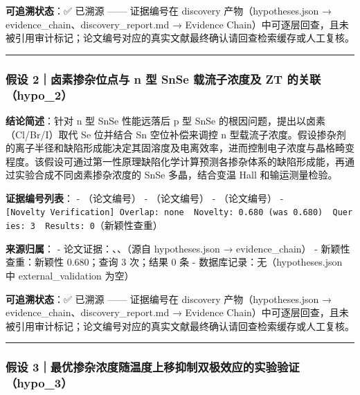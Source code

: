 \documentclass[12pt,a4paper]{ctexart}
\begin{document}
\textbf{可追溯状态}：✅ 已溯源 ------ 证据编号在 discovery 产物（hypotheses.json → evidence\_chain、discovery\_report.md → Evidence Chain）中可逐层回查，且未被引用审计标记；论文编号对应的真实文献最终确认请回查检索缓存或人工复核。

\begin{center}\rule{0.5\linewidth}{0.5pt}\end{center}

\subsubsection{假设 2｜卤素掺杂位点与 n 型 SnSe 载流子浓度及 ZT 的关联（hypo\_2）}\label{ux5047ux8bbe-2ux5364ux7d20ux63baux6742ux4f4dux70b9ux4e0e-n-ux578b-snse-ux8f7dux6d41ux5b50ux6d53ux5ea6ux53ca-zt-ux7684ux5173ux8054hypo_2}

\textbf{结论简述}：针对 n 型 SnSe 性能远落后 p 型 SnSe 的根因问题，提出以卤素（Cl/Br/I）取代 Se 位并结合 Sn 空位补偿来调控 n 型载流子浓度。假设掺杂剂的离子半径和缺陷形成能决定其固溶度及电离效率，进而控制电子浓度与晶格畸变程度。该假设可通过第一性原理缺陷化学计算预测各掺杂体系的缺陷形成能，再通过实验合成不同卤素掺杂浓度的 SnSe 多晶，结合变温 Hall 和输运测量检验。

\textbf{证据编号列表}： - \texttt{\cite{TE122}}（论文编号） - \texttt{\cite{TE115}}（论文编号） - \texttt{\cite{TE113}}（论文编号） - \texttt{{[}Novelty\ Verification{]}\ Overlap:\ none\ \textbar{}\ Novelty:\ 0.680\ (was\ 0.680)\ \textbar{}\ Queries:\ 3\ \textbar{}\ Results:\ 0}（新颖性查重）

\textbf{来源归属}： - 论文证据：\texttt{\cite{TE122}}、\texttt{\cite{TE115}}、\texttt{\cite{TE113}}（源自 hypotheses.json → evidence\_chain） - 新颖性查重：新颖性 0.680；查询 3 次；结果 0 条 - 数据库记录：无（hypotheses.json 中 external\_validation 为空）

\textbf{可追溯状态}：✅ 已溯源 ------ 证据编号在 discovery 产物（hypotheses.json → evidence\_chain、discovery\_report.md → Evidence Chain）中可逐层回查，且未被引用审计标记；论文编号对应的真实文献最终确认请回查检索缓存或人工复核。

\begin{center}\rule{0.5\linewidth}{0.5pt}\end{center}

\subsubsection{假设 3｜最优掺杂浓度随温度上移抑制双极效应的实验验证（hypo\_3）}\label{ux5047ux8bbe-3ux6700ux4f18ux63baux6742ux6d53ux5ea6ux968fux6e29ux5ea6ux4e0aux79fbux6291ux5236ux53ccux6781ux6548ux5e94ux7684ux5b9eux9a8cux9a8cux8bc1hypo_3}
\end{document}
